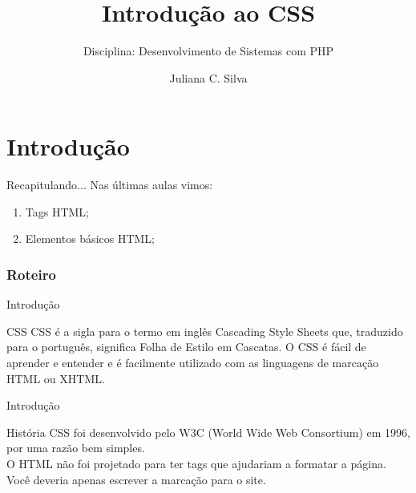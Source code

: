 \documentclass{beamer}
\title[CSS]{Introdução ao CSS}
\subtitle{Disciplina: Desenvolvimento de Sistemas com PHP}
\author{Juliana C. Silva}
\institute{Universidade Positivo}
\begin{document}
\frame{\titlepage}
 

\section{Introdução}
\begin{frame}{Recapitulando...}
Nas últimas aulas vimos:
  \begin{enumerate}
   \item Tags HTML;
   \item Elementos básicos HTML;
  \end{enumerate}
\end{frame}
\begin{frame}
\frametitle{Roteiro} %
\tableofcontents %
\end{frame}
\begin{frame}{Introdução}
\begin{block}{CSS}
CSS é a sigla para o termo em inglês Cascading Style Sheets que, traduzido para o português, significa Folha de Estilo em Cascatas. O CSS é fácil de aprender e entender e é facilmente utilizado com as linguagens de marcação HTML ou XHTML. 
\end{block}
\end{frame}
\begin{frame}{Introdução}
\begin{block}{História}
CSS foi desenvolvido pelo W3C (World Wide Web Consortium) em 1996, por uma razão bem simples. \\
O HTML não foi projetado para ter tags que ajudariam a formatar a página. \\
Você deveria apenas escrever a marcação para o site.
\end{block}
\end{frame}
\end{document}
